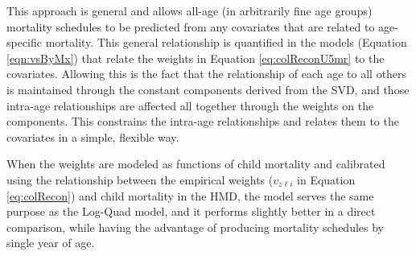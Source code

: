 \documentclass[11pt]{article}
\begin{document}
This approach is general and allows all-age (in arbitrarily fine age groups) mortality schedules to be predicted from any covariates that are related to age-specific mortality.  This general relationship is quantified in the models (Equation \ref{eqn:vsByMx}) that relate the weights in Equation \ref{eq:colReconU5mr} to the covariates.  Allowing this is the fact that the relationship of each age to all others is maintained through the constant components derived from the SVD, and those intra-age relationships are affected all together through the weights on the components.  This constrains the intra-age relationships and relates them to the covariates in a simple, flexible way.  

When the weights are modeled as functions of child mortality and calibrated using the relationship between the empirical weights ($v_{z \ell i}$ in Equation \ref{eq:colRecon}) and child mortality in the HMD, the model serves the same purpose as the Log-Quad \citep{wilmoth2012flexible} model, and it performs slightly better in a direct comparison, while having the advantage of  producing mortality schedules by single year of age. 
\end{document}
